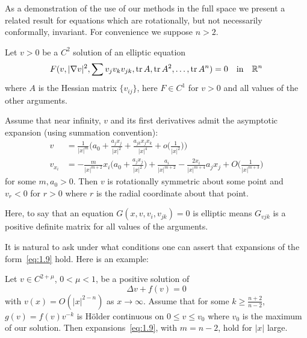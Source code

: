 As a demonstration of the use of our methods in the full space we present a related result for 
equations which are rotationally, but not necessarily conformally, invariant.
For convenience we suppose $n>2$.

\begin{theorem}\label{thm:4}
  Let $v>0$ be a $C^2$ solution of an elliptic equation
  \begin{equation}\label{eq:1.8}
    F(v, |\nabla v|^2, \sum v_jv_kv_{jk}, \operatorname{tr} A, \operatorname{tr} A^2, \ldots, \operatorname{tr} A^n) = 0
    \quad\text{in}\quad \mathbb{R}^n
  \end{equation}
  where $A$ is the Hessian matrix $\{v_{ij}\}$, here $F\in C^1$ for $v>0$
  and all values of the other arguments.

  Assume that near infinity, $v$ and its first derivatives admit the asymptotic
  expansion (using summation convention):
  \begin{equation}\label{eq:1.9}
    \begin{aligned}
      v & = \frac{1}{|x|^m}\biggl(a_0 + \frac{a_jx_j}{|x|^2} + \frac{a_{jk}x_jx_k}{|x|^4}
            + o\biggl(\frac{1}{|x|^2}\biggr)\biggr) \\
      v_{x_i} & = -\frac{m}{|x|^{m+2}} x_i\biggl(a_0 + \frac{a_jx_j}{|x|^2}\biggr)
            + \frac{a_i}{|x|^{m+2}} - \frac{2x_i}{|x|^{m+4}}a_jx_j
            + O\biggl(\frac{1}{|x|^{m+3}}\biggr)
    \end{aligned}
  \end{equation}
  for some $m, a_0> 0$. Then $v$ is rotationally symmetric about some point and $v_r<0$ 
  for $r > 0$ where $r$ is the radial coordinate about that point.
\end{theorem}

Here, to say that an equation $G(x, v, v_i, v_{jk})= 0$ is elliptic means 
$G_{vjk}$ is a positive definite matrix for all values of the arguments.

It is natural to ask under what conditions one can assert that expansions of the 
form~\eqref{eq:1.9} hold. Here is an example:
\begin{proposition}\label{prop:1}
  Let $v\in C^{2+\mu}$, $0<\mu<1$, be a positive solution of
  \begin{equation}\label{eq:1.8prime}
    \Delta v + f(v) = 0 \tag{$1.8'$}
  \end{equation}
  with $v(x) = O(|x|^{2-n})$ as $x\to\infty$. Assume that for some
  $k\geq\frac{n+2}{n-2}$, $g(v) = f(v)v^{-k}$ is H\"older continuous on $0\leq v\leq v_0$
  where $v_0$ is the maximum of our solution. Then expansions~\eqref{eq:1.9},
  with $m=n-2$, hold for $|x|$ large.
\end{proposition}

